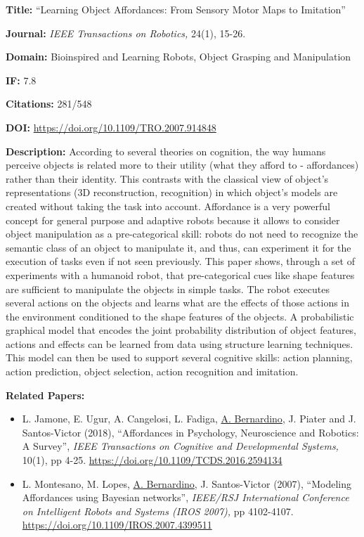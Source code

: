 \textbf{Title:} ``Learning Object Affordances: From Sensory Motor Maps
to Imitation''

\textbf{Journal:} \emph{IEEE Transactions on Robotics,} 24(1), 15-26.

\textbf{Domain:} Bioinspired and Learning Robots, Object Grasping and
Manipulation

\textbf{IF:} 7.8

\textbf{Citations:} 281/548

\textbf{DOI:} \url{https://doi.org/10.1109/TRO.2007.914848}

\textbf{Description:} According to several theories on cognition, the
way humans perceive objects is related more to their utility (what they
afford to - affordances) rather than their identity. This contrasts with
the classical view of object's representations (3D reconstruction,
recognition) in which object's models are created without taking the
task into account. Affordance is a very powerful concept for general
purpose and adaptive robots because it allows to consider object
manipulation as a pre-categorical skill: robots do not need to recognize
the semantic class of an object to manipulate it, and thus, can
experiment it for the execution of tasks even if not seen previously.
This paper shows, through a set of experiments with a humanoid robot,
that pre-categorical cues like shape features are sufficient to
manipulate the objects in simple tasks. The robot executes several
actions on the objects and learns what are the effects of those actions
in the environment conditioned to the shape features of the objects. A
probabilistic graphical model that encodes the joint probability
distribution of object features, actions and effects can be learned from
data using structure learning techniques. This model can then be used to
support several cognitive skills: action planning, action prediction,
object selection, action recognition and imitation.

\textbf{Related Papers:}

\begin{itemize}
\item
  L. Jamone, E. Ugur, A. Cangelosi, L. Fadiga, \ul{A. Bernardino}, J.
  Piater and J. Santos-Victor (2018), ``Affordances in Psychology,
  Neuroscience and Robotics: A Survey'', \emph{IEEE Transactions on
  Cognitive and Developmental Systems,} 10(1), pp 4-25.
  \url{https://doi.org/10.1109/TCDS.2016.2594134}
\item
  L. Montesano, M. Lopes, \ul{A. Bernardino}, J. Santos-Victor (2007),
  ``Modeling Affordances using Bayesian networks'', \emph{IEEE/RSJ
  International Conference on Intelligent Robots and Systems (IROS
  2007),} pp 4102-4107. \url{https://doi.org/10.1109/IROS.2007.4399511}
\end{itemize}

